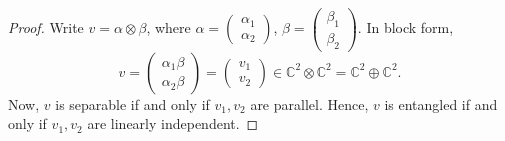 \documentclass[12pt]{article}
\theoremstyle{definition}
\newcommand{\C}{\mathbb{C}}
\begin{document}
\begin{proof}
Write $v=\alpha \otimes \beta$, where $\alpha=\begin{pmatrix}\alpha_1\\ \alpha_2\end{pmatrix}$, $\beta=\begin{pmatrix}\beta_1\\ \beta_2\end{pmatrix}$. In block form,
\[
v=\begin{pmatrix}\alpha_1\beta\\ \alpha_2\beta\end{pmatrix}=\begin{pmatrix}v_1\\ v_2\end{pmatrix} \in \C^2 \otimes \C^2 = \C^2 \oplus \C^2.
\]
Now, $v$ is separable if and only if $v_1,v_2$ are parallel. Hence, $v$ is entangled if and only if $v_1,v_2$ are linearly independent.


\end{proof}
\end{document}
